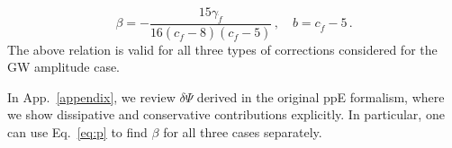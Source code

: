 \documentclass[prd,twocolumn,nofootinbib]{revtex4-1}
\begin{document}
\begin{equation}
\label{eq:2v}
\beta=-\frac{15 \text{$\gamma_{\dot{f}} $}}{16 (\text{$c_{\dot{f}}$}-8) (\text{$c_{\dot{f}}$}-5)}\,, \quad b=c_{\dot{f}}-5\,.
\end{equation}
The above relation is valid for all three types of corrections considered for the GW amplitude case. 

In App.~\ref{appendix}, we review $\delta\Psi$ derived in the original ppE formalism, where we show dissipative and conservative contributions explicitly. In particular, one can use Eq.~\eqref{eq:p} to find $\beta$ for all three cases separately.

\end{document}
